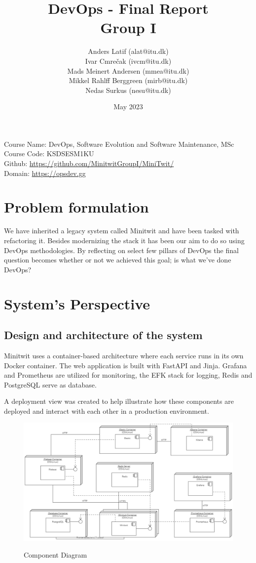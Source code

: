 \documentclass{article}
\title{DevOps - Final Report\\
  \large Group I
}
\author{
Anders Latif (alat@itu.dk)\\
Ivar Cmrečak (ivcm@itu.dk)\\
Mads Meinert Andersen (mmea@itu.dk) \\
Mikkel Rahlff Berggreen (mirb@itu.dk)\\ 
Nedas Surkus (nesu@itu.dk)\\
}
\date{May 2023}
\begin{document}
\maketitle

\vspace*{\fill}
\noindent Course Name: DevOps, Software Evolution and Software Maintenance, MSc\\
Course Code: KSDSESM1KU\\
Github: \url{https://github.com/MinitwitGroupI/MiniTwit/}\\
Domain: \url{https://opsdev.gg}


\pagebreak

\tableofcontents
\pagebreak

\section{Problem formulation}

We have inherited a legacy system called Minitwit and have been tasked with refactoring it. Besides modernizing the stack it has been our aim to do so using DevOps methodologies. By reflecting on select few pillars of DevOps the final question becomes whether or not we achieved this goal; is what we've done DevOps?

\section{System's Perspective} 

\subsection{Design and architecture of the system}

Minitwit uses a container-based architecture where each service runs in its own Docker container. The web application is built with FastAPI and Jinja. Grafana and Prometheus are utilized for monitoring, the EFK stack for logging, Redis and PostgreSQL serve as database.

A deployment view was created to help illustrate how these components are deployed and interact with each other in a production environment.

\begin{figure}[h]
    \includegraphics[width=1\textwidth]{images/DeploymentView2.0.jpg}
    \label{fig:ci_pipeline}
    \centering
    \caption{Component Diagram}
\end{figure}
\end{document}
